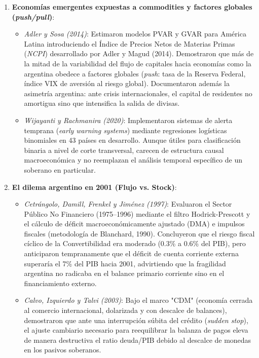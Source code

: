 \documentclass[11pt,a4paper]{article}
\begin{document}
\begin{enumerate}[leftmargin=1.5em]
    \item \textbf{Economías emergentes expuestas a commodities y factores globales (\textit{push/pull})}:
    \begin{itemize}
        \item \textit{Adler y Sosa (2014)}: Estimaron modelos PVAR y GVAR para América Latina introduciendo el Índice de Precios Netos de Materias Primas (\textit{NCPI}) desarrollado por Adler y Magud (2014). Demostraron que más de la mitad de la variabilidad del flujo de capitales hacia economías como la argentina obedece a factores globales (\textit{push}: tasa de la Reserva Federal, índice VIX de aversión al riesgo global). Documentaron además la asimetría argentina: ante crisis internacionales, el capital de residentes no amortigua sino que intensifica la salida de divisas.
        \item \textit{Wijayanti y Rachmanira (2020)}: Implementaron sistemas de alerta temprana (\textit{early warning systems}) mediante regresiones logísticas binomiales en 43 países en desarrollo. Aunque útiles para clasificación binaria a nivel de corte transversal, carecen de estructura causal macroeconómica y no reemplazan el análisis temporal específico de un soberano en particular.
    \end{itemize}

    \item \textbf{El dilema argentino en 2001 (Flujo vs. Stock)}:
    \begin{itemize}
        \item \textit{Cetrángolo, Damill, Frenkel y Jiménez (1997)}: Evaluaron el Sector Público No Financiero (1975--1996) mediante el filtro Hodrick-Prescott y el cálculo de déficit macroeconómicamente ajustado (DMA) e impulsos fiscales (metodología de Blanchard, 1990). Concluyeron que el riesgo fiscal cíclico de la Convertibilidad era moderado (0.3\% a 0.6\% del PIB), pero anticiparon tempranamente que el déficit de cuenta corriente externa superaría el 7\% del PIB hacia 2001, advirtiendo que la fragilidad argentina no radicaba en el balance primario corriente sino en el financiamiento externo.
        \item \textit{Calvo, Izquierdo y Talvi (2003)}: Bajo el marco "CDM" (economía cerrada al comercio internacional, dolarizada y con descalce de balances), demostraron que ante una interrupción súbita del crédito (\textit{sudden stop}), el ajuste cambiario necesario para reequilibrar la balanza de pagos eleva de manera destructiva el ratio deuda/PIB debido al descalce de monedas en los pasivos soberanos.
    \end{itemize}


\end{enumerate}
\end{document}
